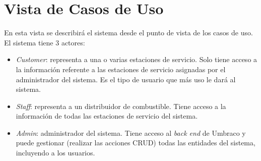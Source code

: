     \section{Vista de Casos de Uso} \label{vistaCasosDeUso}
    En esta vista se describirá el sistema desde el punto de vista de los casos de uso. El sistema tiene 3 actores:

    \begin{itemize}
        \item \emph{Customer}: representa a una o varias estaciones de servicio. Solo tiene acceso a la información referente a las estaciones de servicio asignadas por el administrador del sistema. Es el tipo de usuario que más uso le dará al sistema.
        \item \emph{Staff}: representa a un distribuidor de combustible. Tiene acceso a la información de todas las estaciones de servicio del sistema.
        \item \emph{Admin}: administrador del sistema. Tiene acceso al \emph{back end} de Umbraco y puede gestionar (realizar las acciones CRUD) todas las entidades del sistema, incluyendo a los usuarios.
    \end{itemize}

